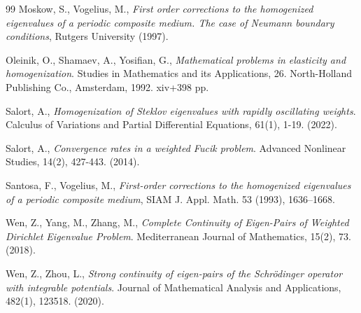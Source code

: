 \documentclass[12pt]{amsart}
\theoremstyle{definition}
\theoremstyle{remark}
\numberwithin{equation}{section}
\begin{document}
\begin{thebibliography}{99}
Moskow, S., Vogelius, M., \emph{First order corrections to the homogenized eigenvalues of a periodic composite medium. The case of Neumann boundary conditions}, Rutgers University (1997).


Oleinik, O., Shamaev, A., Yosifian, G., \emph{Mathematical problems in elasticity and homogenization}. Studies in Mathematics and its Applications, 26. North-Holland Publishing Co., Amsterdam, 1992. {\rm xiv}+398 pp. 



Salort, A., \emph{Homogenization of Steklov eigenvalues with rapidly oscillating weights}. Calculus of Variations and Partial Differential Equations, 61(1), 1-19. (2022).


 


Salort, A.,  \emph{Convergence rates in a weighted Fucik problem}. Advanced Nonlinear Studies, 14(2), 427-443. (2014).

 

Santosa, F., Vogelius, M., \emph{First-order corrections to the homogenized eigenvalues of
a periodic composite medium}, SIAM J. Appl. Math. 53 (1993), 1636–1668.

 

Wen, Z., Yang, M.,  Zhang, M., \emph{Complete Continuity of Eigen-Pairs of Weighted Dirichlet Eigenvalue Problem}. Mediterranean Journal of Mathematics, 15(2), 73. (2018).

Wen, Z.,   Zhou, L., \emph{Strong continuity of eigen-pairs of the Schr\"odinger operator with integrable potentials}. Journal of Mathematical Analysis and Applications, 482(1), 123518. (2020).




 


\end{thebibliography}
\end{document}
